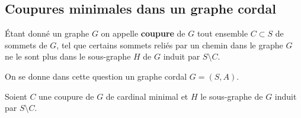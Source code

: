 \subsection{Coupures minimales dans un graphe cordal}\label{part:cmin}
Étant donné un graphe $G$ on appelle {\bf coupure} de $G$ tout ensemble $C\subset S$ de sommets de $G$,%
tel que certains sommets reliés par un chemin dans le graphe $G$ ne le sont plus dans le sous-graphe $H$ de $G$ induit par $S\setminus C$.

On se donne dans cette question un graphe cordal $G = (S, A)$. 

Soient $C$ une coupure de $G$ de cardinal minimal %
et $H$ le sous-graphe de $G$ induit par $S\setminus C$. 

